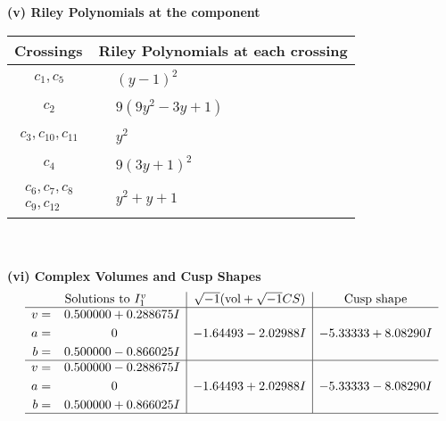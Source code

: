 \documentclass[1p]{elsarticle_modified}
\theoremstyle{definition}
\newcommand{\I}{\sqrt{-1}}
\begin{document}
\newpage\renewcommand{\arraystretch}{1}
\flushleft \textbf{(v) Riley Polynomials at the component}\newline \\
\begin{tabular}{m{50pt}|m{274pt}}
Crossings & \hspace{64pt}Riley Polynomials at each crossing \\
\hline $$\begin{aligned}c_{1},c_{5}\end{aligned}$$&$\begin{aligned}
&(y-1)^2
\end{aligned}$\\
\hline $$\begin{aligned}c_{2}\end{aligned}$$&$\begin{aligned}
&9(9 y^2-3 y+1)
\end{aligned}$\\
\hline $$\begin{aligned}c_{3},c_{10},c_{11}\end{aligned}$$&$\begin{aligned}
&y^2
\end{aligned}$\\
\hline $$\begin{aligned}c_{4}\end{aligned}$$&$\begin{aligned}
&9(3 y+1)^2
\end{aligned}$\\
\hline $$\begin{aligned}c_{6},c_{7},c_{8}\\c_{9},c_{12}\end{aligned}$$&$\begin{aligned}
&y^2+y+1
\end{aligned}$\\
\hline
\end{tabular}\\~\\
\newpage\flushleft \textbf{(vi) Complex Volumes and Cusp Shapes}
$$\begin{array}{c|c|c}  
\text{Solutions to }I^v_{1}& \I (\text{vol} + \sqrt{-1}CS) & \text{Cusp shape}\\
 \hline 
\begin{aligned}
v &= \phantom{-}0.500000 + 0.288675 I \\
a &= \phantom{-0.000000 } 0 \\
b &= \phantom{-}0.500000 - 0.866025 I\end{aligned}
 & -1.64493 - 2.02988 I & -5.33333 + 8.08290 I \\ \hline\begin{aligned}
v &= \phantom{-}0.500000 - 0.288675 I \\
a &= \phantom{-0.000000 } 0 \\
b &= \phantom{-}0.500000 + 0.866025 I\end{aligned}
 & -1.64493 + 2.02988 I & -5.33333 - 8.08290 I\\
 \hline 
 \end{array}$$\newpage
\end{document}

